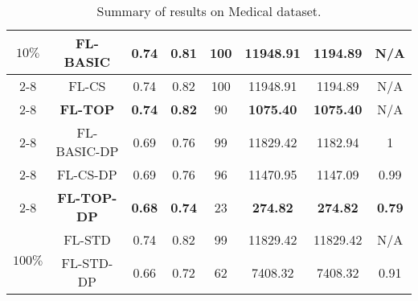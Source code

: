 \documentclass[accepted]{uai2021} %
\begin{document}
\begin{table*}[!ht]
\begin{minipage}{.5\linewidth}
{\begin{tabular}{|c|c|c|c|c|c|c|c|}
        \multirow{8}{*}{$10\%$} &  FL-BASIC  & 0.74 & 0.81 & 100 & 11948.91 & 1194.89 &N/A \\
        \cline{2-8}
        &  FL-CS &  0.74  & 0.82 & 100 & 11948.91 & 1194.89 & N/A \\
        \cline{2-8}
        &  \textbf{FL-TOP} & \textbf{0.74}  & \textbf{0.82} & 90 & \textbf{1075.40} & \textbf{1075.40} &N/A \\
        \cline{2-8}
        \cline{2-8}
        &  FL-BASIC-DP  & 0.69 & 0.76 & 99 & 11829.42 & 1182.94 & 1 \\
        \cline{2-8}
        &  FL-CS-DP &  0.69  & 0.76 & 96 & 11470.95 & 1147.09 & 0.99\\
        \cline{2-8}
        &  \textbf{FL-TOP-DP} &  \textbf{0.68}  & \textbf{0.74} & 23 & \textbf{274.82} & \textbf{274.82} & \textbf{0.79}\\
        \hline 
        \hline
        
        
        \multirow{2}{*}{$100\%$} &  FL-STD  & 0.74 & 0.82 & 99 & 11829.42 & 11829.42 &N/A \\
        \cline{2-8}
        &  FL-STD-DP   & 0.66 & 0.72 & 62 & 7408.32 & 7408.32 & 0.91 \\
        \hline
        
    \end{tabular}}
    \caption{Summary of results on Medical dataset.}
    \label{tab:description_results_Medical_data_reduced}
\vspace{-.3cm}
\end{minipage} 
\end{table*}
\end{document}

